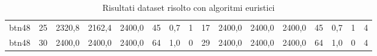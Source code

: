 \begin{table}[]
\begin{tabular}{llllllllllllllll}
		btn48   & 25     & 2320,8                                              & 2162,4                                              & 2400,0                                              & 45                                                  & 0,7                                                 & 1      & 17                                                        & 2400,0                                              & 2400,0                                              & 2400,0                                              & 45                                                  & 0,7                                                 & 1      & 4                                                         \\
		btn48   & 30     & 2400,0                                              & 2400,0                                              & 2400,0                                              & 64                                                  & 1,0                                                 & 0      & 29                                                        & 2400,0                                              & 2400,0                                              & 2400,0                                              & 64                                                  & 1,0                                                 & 0      & 4                                                         \\ \hline
	\end{tabular}
	\caption{Risultati dataset risolto con algoritmi euristici}
	\label{tab:euristica}
\end{table}
%
